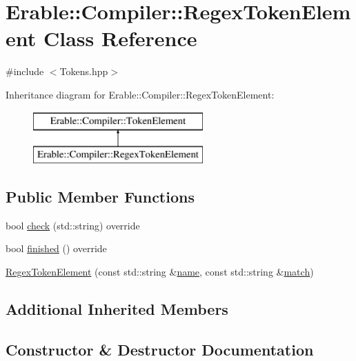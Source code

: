 \hypertarget{class_erable_1_1_compiler_1_1_regex_token_element}{}\section{Erable\+::Compiler\+::Regex\+Token\+Element Class Reference}
\label{class_erable_1_1_compiler_1_1_regex_token_element}


{\ttfamily \#include $<$Tokens.\+hpp$>$}

Inheritance diagram for Erable\+::Compiler\+::Regex\+Token\+Element\+:\begin{figure}[H]
\begin{center}
\leavevmode
\includegraphics[height=2.000000cm]{class_erable_1_1_compiler_1_1_regex_token_element}
\end{center}
\end{figure}
\subsection*{Public Member Functions}
\begin{DoxyCompactItemize}
\item 
bool \mbox{\hyperlink{class_erable_1_1_compiler_1_1_regex_token_element_acfd2c3aed9ab516144e6d98b8ce5690d}{check}} (std\+::string) override
\item 
bool \mbox{\hyperlink{class_erable_1_1_compiler_1_1_regex_token_element_ae97792bfc64def19e42876c7d823b9e4}{finished}} () override
\item 
\mbox{\hyperlink{class_erable_1_1_compiler_1_1_regex_token_element_aaea5dd20478e1b6ed539f37b98e2ebfe}{Regex\+Token\+Element}} (const std\+::string \&\mbox{\hyperlink{class_erable_1_1_compiler_1_1_token_element_aeeb8454fbc160978c6fcb27b77ff9d90}{name}}, const std\+::string \&\mbox{\hyperlink{class_erable_1_1_compiler_1_1_token_element_acae3d5d6e860524271a0f164bbd25d83}{match}})
\end{DoxyCompactItemize}
\subsection*{Additional Inherited Members}


\subsection{Constructor \& Destructor Documentation}
\mbox{\label{class_erable_1_1_compiler_1_1_regex_token_element_aaea5dd20478e1b6ed539f37b98e2ebfe}} 
